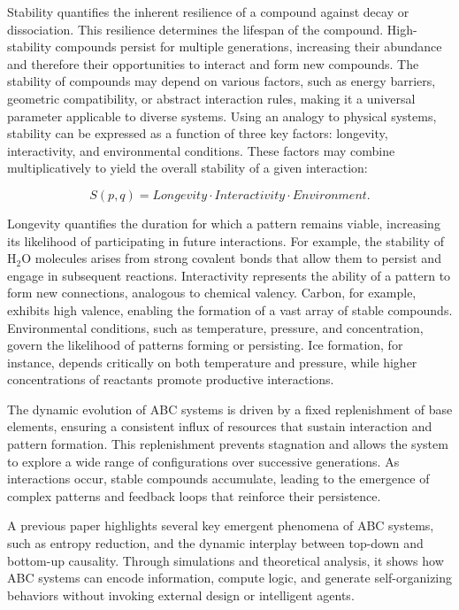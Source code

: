 \documentclass[entropy,article,submit,pdftex,oneauthor]{Definitions/mdpi}
\begin{document}
Stability quantifies the inherent resilience of a compound against decay or dissociation. This resilience determines the lifespan of the compound. High-stability compounds persist for multiple generations, increasing their abundance and therefore their opportunities to interact and form new compounds. The stability of compounds may depend on various factors, such as energy barriers, geometric compatibility, or abstract interaction rules, making it a universal parameter applicable to diverse systems. Using an analogy to physical systems, stability can be expressed as a function of three key factors: longevity, interactivity, and environmental conditions. These factors may combine multiplicatively to yield the overall stability of a given interaction:

\[
S(p, q) = Longevity \cdot Interactivity \cdot Environment.
\]

Longevity quantifies the duration for which a pattern remains viable, increasing its likelihood of participating in future interactions. For example, the stability of \( \text{H}_2\text{O} \) molecules arises from strong covalent bonds that allow them to persist and engage in subsequent reactions. Interactivity represents the ability of a pattern to form new connections, analogous to chemical valency. Carbon, for example, exhibits high valence, enabling the formation of a vast array of stable compounds. Environmental conditions, such as temperature, pressure, and concentration, govern the likelihood of patterns forming or persisting. Ice formation, for instance, depends critically on both temperature and pressure, while higher concentrations of reactants promote productive interactions.

The dynamic evolution of ABC systems is driven by a fixed replenishment of base elements, ensuring a consistent influx of resources that sustain interaction and pattern formation. This replenishment prevents stagnation and allows the system to explore a wide range of configurations over successive generations. As interactions occur, stable compounds accumulate, leading to the emergence of complex patterns and feedback loops that reinforce their persistence.

A previous paper \cite{adler2024howinfoevolves} highlights several key emergent phenomena of ABC systems, such as entropy reduction, and the dynamic interplay between top-down and bottom-up causality. Through simulations and theoretical analysis, it shows how ABC systems can encode information, compute logic, and generate self-organizing behaviors without invoking external design or intelligent agents.
\end{document}
